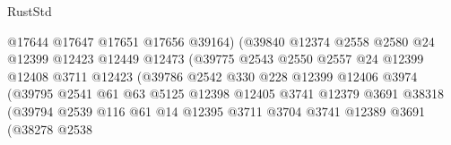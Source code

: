 \begin{lexlean}{RustStd}
\begin{coremodule}
                                      @17644
                                      @17647
                                      @17651
                                      @17656
                                      @39164)
                                    (@39840
                                      @12374
                                      @2558
                                      @2580
                                      @24
                                      @12399
                                      @12423
                                      @12449
                                      @12473
                                      (@39775
                                        @2543
                                        @2550
                                        @2557
                                        @24
                                        @12399
                                        @12408
                                        @3711
                                        @12423
                                        (@39786
                                          @2542
                                          @330
                                          @228
                                          @12399
                                          @12406
                                          @3974
                                          (@39795
                                            @2541
                                            @61
                                            @63
                                            @5125
                                            @12398
                                            @12405
                                            @3741
                                            @12379
                                            @3691
                                            @38318
                                            (@39794
                                              @2539
                                              @116
                                              @61
                                              @14
                                              @12395
                                              @3711
                                              @3704
                                              @3741
                                              @12389
                                              @3691
                                              (@38278
                                                @2538

\end{coremodule}
\end{lexlean}
